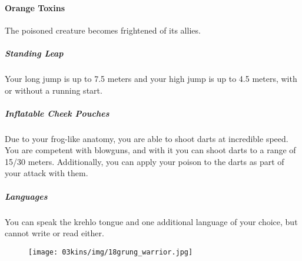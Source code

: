 \begin{linenumbers}
\paragraph{Orange Toxins} The poisoned creature becomes frightened of its allies.


\subparagraph{Standing Leap} Your long jump is up to 7.5 meters and your high jump is up to 4.5 meters, with or without a running start.


\subparagraph{Inflatable Cheek Pouches} Due to your frog-like anatomy, you are able to shoot darts at incredible speed.
You are competent with blowguns, and with it you can shoot darts to a range of 15/30 meters.
Additionally, you can apply your poison to the darts as part of your attack with them.


\subparagraph{Languages} You can speak the krehlo tongue and one additional language of your choice, but cannot write or read either.

\begin{figure}[!b]
    \centering
    \texttt{[image: 03kins/img/18grung\_warrior.jpg]}
\end{figure}
\end{linenumbers}

\newpage
